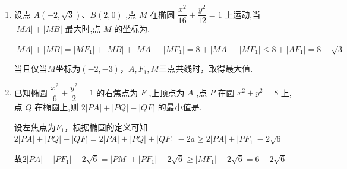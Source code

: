 \begin{enumerate}
\begin{enumerate}
        \item 设点 $A\left( {-2,\sqrt{3}}\right) \text{、}B\left( {2,0}\right)$ ,点 $M$ 在椭圆 $\dfrac{{x}^{2}}{16} + \dfrac{{y}^{2}}{12} = 1$ 上运动,当 $\left| {MA}\right|  + \left| {MB}\right|$ 最大时,点 $M$ 的坐标为.
        \begin{jieda}
            $|MA|+|MB| = |MF_1|+|MB|+|MA|-|MF_1| = 8+|MA|-|MF_1| \leq 8 + |AF_1| = 8+\sqrt{3}$
    
            当且仅当$M$坐标为$(-2,-3)$，$A,F_1,M$三点共线时，取得最大值.
        \end{jieda}
        \item 已知椭圆 $\dfrac{{x}^{2}}{6} + \dfrac{{y}^{2}}{2} = 1$ 的右焦点为 $F$ ,上顶点为 $A$ ,点 $P$ 在圆 ${x}^{2} + {y}^{2} = 8$ 上,点 $Q$ 在椭圆上,则 $2\left| {PA}\right|  + \left| {PQ}\right|  - \left| {QF}\right|$ 的最小值是.
        \begin{jieda}
            设左焦点为$F_1$，根据椭圆的定义可知$2\left| {PA}\right|  + \left| {PQ}\right|  - \left| {QF}\right| = 2\left| {PA}\right|  + \left| {PQ}\right|  + \left| {QF_1}\right| - 2a \geq 2|PA| + |PF_1| - 2\sqrt{6}$

            

            故$2|PA| + |PF_1| - 2\sqrt{6} = |PM| + |PF_1| - 2\sqrt{6} \geq |MF_1| - 2\sqrt{6} = 6-2\sqrt{6}$
        \end{jieda}
    \end{enumerate}


\end{enumerate}
